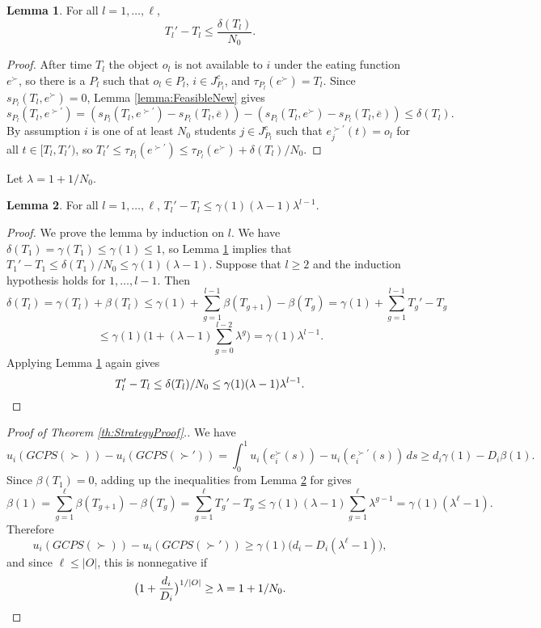 \documentclass[12pt]{article}
\theoremstyle{definition}
\newtheorem{lem}{Lemma}
\newcommand{\bare}{\overline{e}}
\begin{document}
\begin{appendix}
\begin{lem} \label{lemma:KM5New}
  For all $l = 1, \ldots, \ell$, 
  $$T_l' - T_l \le \frac{\delta(T_l)}{N_0}.$$
\end{lem}

\begin{proof}
  After time $T_l$ the object $o_l$ is not available to $i$ under the eating function $e^\succ$, so there is a $P_l$ such that $o_l \in P_l$, $i \in J_{P_l}^c$, and $\tau_{P_l}(e^\succ) = T_l$. Since $s_{P_l}(T_l,e^{\succ}) = 0$, Lemma \ref{lemma:FeasibleNew} gives
  $$s_{P_l}(T_l,e^{\succ'}) = (s_{P_l}(T_l,e^{\succ'}) - s_{P_l}(T_l,\bare)) - (s_{P_l}(T_l,e^{\succ}) - s_{P_l}(T_l,\bare)) \le \delta(T_l).$$
  By assumption $i$ is one of at least $N_0$ students $j \in J_{P_l}^c$ such that $e^{\succ'}_j(t) = o_l$ for all $t \in [T_l, T_l')$, so $T_l' \le \tau_{P_l}(e^{\succ'}) \le \tau_{P_l}(e^\succ) + \delta(T_l)/N_0$.  
\end{proof}

Let $\lambda = 1 + 1/N_0$.

\begin{lem} \label{lemma:KM6}
  For all $l = 1, \ldots, \ell$,
  $T_l' - T_l \le \gamma(1)(\lambda - 1)\lambda^{l-1}$.
\end{lem}

\begin{proof}
  We prove the lemma by induction on $l$.  We have $\delta(T_1) = \gamma(T_1) \le \gamma(1) \le 1$, so Lemma \ref{lemma:KM5New} implies that $T_1' - T_1 \le \delta(T_1) /N_0 \le \gamma(1)(\lambda - 1)$. 
  Suppose that $l \ge 2$ and the induction hypothesis holds for $1, \ldots, l - 1$.  Then
  $$\delta(T_l) = \gamma(T_l) + \beta(T_l) \le \gamma(1) + \sum_{g = 1}^{l-1} \beta(T_{g+1}) - \beta(T_g) = \gamma(1) + \sum_{g = 1}^{l-1} T_g' - T_g$$
  $$\le \gamma(1)\Big(1 + (\lambda - 1)\sum_{g = 0}^{l-2}\lambda^g\Big) = \gamma(1)\lambda^{l-1}.$$
  Applying Lemma \ref{lemma:KM5New} again gives
  \begin{equation*}
  T_l' - T_l \le \delta(T_l)/N_0 \le \gamma(1)(\lambda - 1)\lambda^{l-1}. \qedhere
  \end{equation*}
\end{proof}

\begin{proof}[Proof of Theorem \ref{th:StrategyProof}.]
  We have
  $$u_i(GCPS(\succ)) - u_i(GCPS(\succ')) = \int_0^1 u_i(e_i^\succ(s)) - u_i(e_i^{\succ'}(s)) \, ds \ge d_i\gamma(1) - D_i\beta(1).$$
  Since $\beta(T_1) = 0$, adding up the inequalities from Lemma \ref{lemma:KM6} for gives
  $$\beta(1) = \sum_{g = 1}^{\ell} \beta(T_{g+1}) - \beta(T_g) = \sum_{g = 1}^{\ell} T_g' - T_g \le \gamma(1)(\lambda - 1)
  \sum_{g = 1}^{\ell}\lambda^{g-1} = \gamma(1)(\lambda^{\ell} - 1).$$ 
  Therefore
  $$u_i(GCPS(\succ)) - u_i(GCPS(\succ')) \ge \gamma(1)\big(d_i - D_i(\lambda^{\ell} - 1)\big),$$
  and since $\ell \le |O|$, this is nonnegative if
  \begin{equation*}
  \big(1 + \frac{d_i}{D_i}\big)^{1/|O|} \ge \lambda = 1 + 1/N_0. \qedhere
  \end{equation*}
\end{proof}

\end{appendix}



\end{document}
